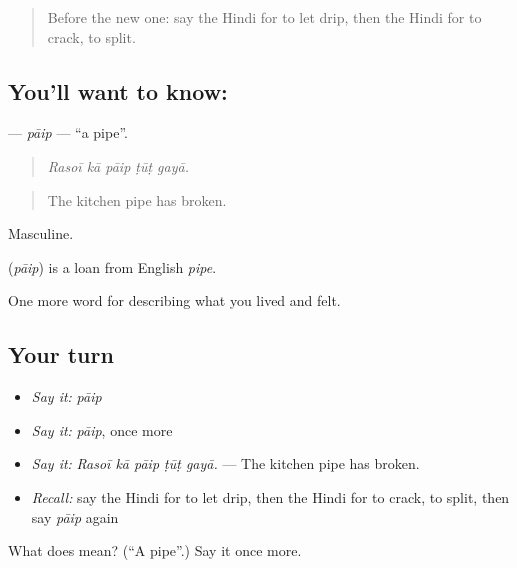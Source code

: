 \label{lesson:HI-C516-paip}



\begin{quote}
Before the new one: say the Hindi for to let drip, then the Hindi for to crack, to split.
\end{quote}

\subsection*{You'll want to know: }
\textbf{} — \emph{pāip} — \textquotedblleft{}a pipe\textquotedblright{}.

\begin{quote}
    
\end{quote}

\begin{quote}
\emph{Rasoī kā pāip ṭūṭ gayā.}
\end{quote}

\begin{quote}
The kitchen pipe has broken.
\end{quote}

Masculine.

\begin{cousinweb}
\textbf{} (\emph{pāip}) is a loan from English \emph{pipe}.
\end{cousinweb}

\begin{grammarlens}[title={What you've built}]
One more word for describing what you lived and felt.
\end{grammarlens}

\subsection*{Your turn}
\begin{itemize}
\raggedright
  \item \emph{Say it:} \emph{pāip}
  \item \emph{Say it:} \emph{pāip}, once more
  \item \emph{Say it:} \emph{Rasoī kā pāip ṭūṭ gayā.} — The kitchen pipe has broken.
  \item \emph{Recall:} say the Hindi for to let drip, then the Hindi for to crack, to split, then say \emph{pāip} again
\end{itemize}

\begin{tcolorbox}[breakable,colback=teal!4,colframe=teal!35!black,title={Before you move on}]
What does  mean? (\textquotedblleft{}A pipe\textquotedblright{}.) Say it once more.
\end{tcolorbox}
